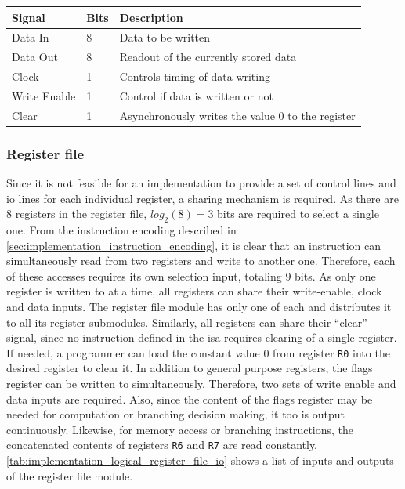 \begin{table}[H]
    \centering
    \begin{tabular}{|l|l|l|} 
        \hline
        \textbf{\textbf{Signal}} & \textbf{Bits}           & \textbf{Description}                               \\ 
        \hline
        Data In                  & 8                       & Data to be written                                 \\ 
        \hline
        Data Out                 & 8                       & Readout of the currently stored data               \\ 
        \hline
        Clock                    & 1                       & Controls timing of data writing                    \\ 
        \hline
        Write Enable             & 1                       & Control if data is written or not                  \\ 
        \hline
        Clear                    & 1                       & Asynchronously writes the value 0 to the register  \\
        \hline
    \end{tabular}
    \label{tab:implementation_logical_register_io}
\end{table}

\subsubsection{Register file}

Since it is not feasible for an implementation to provide a set of control lines and \ac{io} lines for each individual register, a sharing mechanism is required. As there are 8 registers in the register file, $log_2(8) = 3$ bits are required to select a single one. From the instruction encoding described in \autoref{sec:implementation_instruction_encoding}, it is clear that an instruction can simultaneously read from two registers and write to another one. Therefore, each of these accesses requires its own selection input, totaling 9 bits. As only one register is written to at a time, all registers can share their write-enable, clock and data inputs. The register file module has only one of each and distributes it to all its register submodules. Similarly, all registers can share their ``clear'' signal, since no instruction defined in the \ac{isa} requires clearing of a single register. If needed, a programmer can load the constant value 0 from register \texttt{R0} into the desired register to clear it. In addition to general purpose registers, the flags register can be written to simultaneously. Therefore, two sets of write enable and data inputs are required. Also, since the content of the flags register may be needed for computation or branching decision making, it too is output continuously. Likewise, for memory access or branching instructions, the concatenated contents of registers \texttt{R6} and \texttt{R7} are read constantly. \autoref{tab:implementation_logical_register_file_io} shows a list of inputs and outputs of the register file module.

